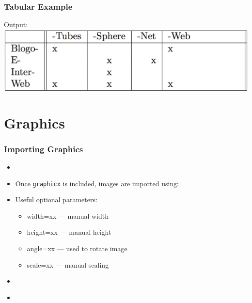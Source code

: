 \documentclass[notes=only]{beamer}
\newcommand{\snip}[1]
{
    
}
\begin{document}
\begin{frame} \frametitle{Tabular Example}
    Output:
    \includegraphics[width=\textwidth]{Examples/6-tables.png}
\end{frame}


\section{Graphics}


\begin{frame} \frametitle{Importing Graphics}
    \begin{itemize}
        \item \snip{graphicx.tex}
        \item Once \texttt{graphicx} is included, images are imported using:\\    
        \snip{includegraphics.tex}
        \item Useful optional parameters:
        \begin{itemize}
            \item width=xx --- manual width
            \item height=xx --- manual height
            \item angle=xx --- used to rotate image
            \item scale=xx --- manual scaling
        \end{itemize}
            
        \item \snip{textwidth.tex}\ \\
        \item \snip{05textwidth.tex}
    \end{itemize}
\end{frame}
\end{document}
